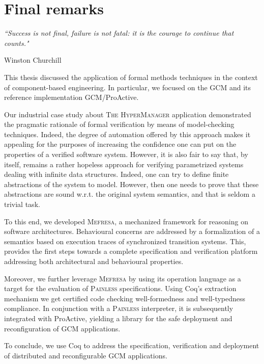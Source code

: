 
\chapter{Final remarks} 
\label{chap:conclusion} 

\epigraph{\textit{“Success is not final, failure is not fatal: it is the courage to continue that counts."}}{Winston Churchill}



\minitoc





		This thesis discussed the application of formal methods techniques in the context of 
	component-based engineering. In particular, we focused on the \ac{GCM} and its reference 
	implementation GCM/ProActive.    	

		Our industrial case study about 
	\textsc{The HyperManager} application demonstrated the pragmatic rationale of
	formal verification by means of model-checking techniques. Indeed, the degree of automation
	offered by this approach makes it appealing for the purposes of increasing the confidence
	one can put on the properties of a verified software system. However, it is also fair to say that,
	by itself, remains a rather hopeless approach for verifying parametrized systems dealing
	with infinite data structures. Indeed, one can try to define finite abstractions of 
	the system to model. However, then one needs to prove that these abstractions are sound 
	w.r.t. the original system semantics, and that is seldom a trivial task.
	
		To this end, we developed \textsc{Mefresa}, a mechanized framework for reasoning on software 
	architectures. Behavioural concerns are addressed by a formalization of
	a semantics based on execution traces of synchronized transition systems.
	This, provides the first steps towards a complete specification and verification
	platform addressing both architectural and behavioural properties. 
	
		Moreover, we further leverage \textsc{Mefresa} by using its \textsf{operation} language
	as a target for the evaluation of \textsc{Painless} specifications. Using Coq's extraction
	mechanism we get certified code checking well-formedness and well-typedness compliance.	
	In conjunction with a \textsc{Painless} interpreter, it is subsequently integrated with 
	ProActive, yielding a library for the safe deployment and reconfiguration of
	 \ac{GCM} applications.
		
		
	To conclude, we use Coq to address the specification, verification and deployment of
	distributed and reconfigurable \ac{GCM} applications. 

